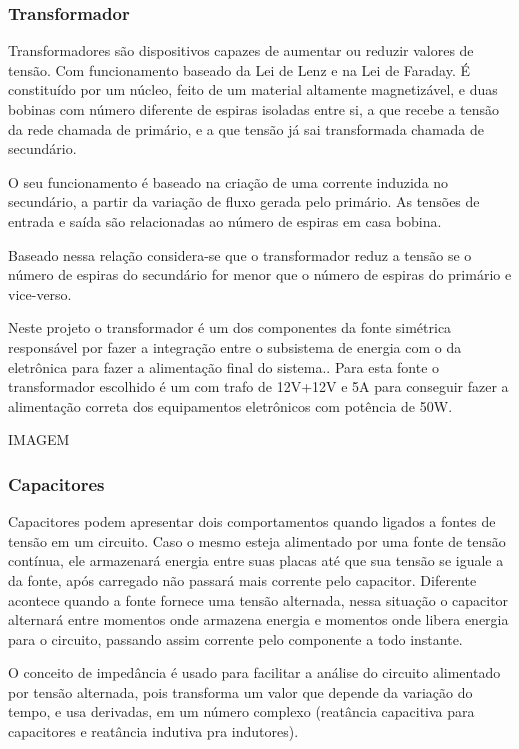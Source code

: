 \subsubsection{Transformador}
Transformadores são dispositivos capazes de aumentar ou reduzir valores de tensão. Com funcionamento baseado da Lei de Lenz e na Lei de Faraday. É constituído por um núcleo, feito de um material altamente magnetizável, e duas bobinas com número diferente de espiras isoladas entre si, a que recebe a tensão da rede chamada de primário, e a que tensão já sai transformada chamada de secundário.

O seu funcionamento é baseado na criação de uma corrente induzida no secundário, a partir da variação de fluxo gerada pelo primário. As tensões de entrada e saída são relacionadas ao número de espiras em casa bobina.

Baseado nessa relação considera-se que o transformador reduz a tensão se o número de espiras do secundário for menor que o número de espiras do primário e vice-verso.

Neste projeto o transformador é  um dos componentes da fonte simétrica responsável por fazer a integração entre o subsistema de energia com o da eletrônica para fazer a alimentação final do sistema.. Para esta fonte o transformador escolhido é um com trafo de 12V+12V e 5A para conseguir fazer a alimentação correta dos equipamentos eletrônicos com potência de 50W.

IMAGEM

\subsubsection{Capacitores}
Capacitores podem apresentar dois comportamentos quando ligados a fontes de tensão em um circuito. Caso o mesmo esteja alimentado por uma fonte de tensão contínua, ele armazenará energia entre suas placas até que sua tensão se iguale a da fonte, após carregado não passará mais corrente pelo capacitor. Diferente acontece quando a fonte fornece uma tensão alternada, nessa situação o capacitor alternará entre momentos onde armazena energia e momentos onde libera energia para o circuito, passando assim corrente pelo componente a todo instante.

O conceito de impedância é usado para facilitar a análise do circuito alimentado por tensão alternada, pois transforma um valor que depende da variação do tempo, e usa derivadas, em um número complexo (reatância capacitiva para capacitores e reatância indutiva pra indutores).

